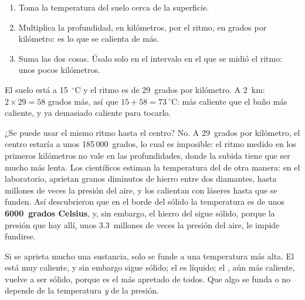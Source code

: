 \begin{method}\label{met:g6:inside-the-earth:temperature}
\begin{enumerate}
  \item Toma la temperatura del suelo cerca de la superficie.
  \item Multiplica la profundidad, en kilómetros, por el ritmo, en grados
        por kilómetro: es lo que se calienta de más.
  \item Suma las dos cosas. Úsalo solo en el intervalo en el que se midió
        el ritmo: unos pocos kilómetros.
\end{enumerate}
\end{method}

\begin{example}\label{ex:g6:inside-the-earth:two-km}
El suelo está a 15~$^\circ$C y el ritmo es de 29~grados por kilómetro. A
2~km: $2 \times 29 = 58$ grados más, así que $15 + 58 = 73~^\circ$C: más
caliente que el baño más caliente, y ya demasiado caliente para tocarlo.
\end{example}

¿Se puede usar el mismo ritmo hasta el centro? No. A 29~grados por
kilómetro, el centro estaría a unos 185\,000~grados, lo cual es
imposible: el ritmo medido en los primeros kilómetros no vale en las profundidades, donde la subida tiene que ser mucho más lenta. Los científicos estiman la temperatura
del  de otra manera: en el laboratorio, aprietan granos diminutos
de hierro entre dos diamantes, hasta millones de veces la presión del
aire, y los calientan con láseres hasta que se funden. Así descubrieron
que en el borde del  sólido la temperatura es de unos
\textbf{6000~grados Celsius}, y, sin embargo, el hierro del  sigue sólido, porque la presión que hay allí, unos
3.3~millones de veces la presión del aire, le impide fundirse.

\begin{remark}\label{rem:g6:inside-the-earth:pressure}
Si se aprieta mucho una sustancia, solo se funde a una temperatura más
alta. El  está muy caliente, y sin embargo sigue sólido; el  es líquido; el , aún más caliente, vuelve a ser
sólido, porque es el más apretado de todos. Que algo se funda o no depende
de la temperatura \emph{y} de la presión.
\end{remark}

